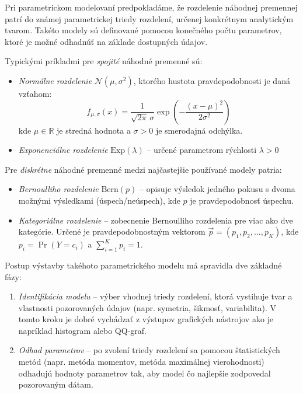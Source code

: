 Pri parametrickom modelovaní predpokladáme, že rozdelenie náhodnej premennej patrí do známej parametrickej triedy rozdelení, určenej konkrétnym analytickým tvarom. Takéto modely sú definované pomocou konečného počtu parametrov, ktoré je možné odhadnúť na základe dostupných údajov.

Typickými príkladmi pre \textit{spojité} náhodné premenné sú:
\begin{itemize}
  \item \textit{Normálne rozdelenie} $\mathcal{N}(\mu, \sigma^2)$, ktorého hustota pravdepodobnosti je daná vzťahom:
  \begin{equation}
    f_{\mu,\sigma}(x) = \frac{1}{\sqrt{2\pi}\,\sigma} \exp\left( -\frac{(x - \mu)^2}{2\sigma^2} \right)
  \end{equation}
  kde $\mu \in \mathbb{R}$ je stredná hodnota a $\sigma > 0$ je smerodajná odchýlka.
  
  \item \textit{Exponenciálne rozdelenie} $\mathrm{Exp}(\lambda)$ – určené parametrom rýchlosti $\lambda > 0$
\end{itemize}

Pre \textit{diskrétne} náhodné premenné medzi najčastejšie používané modely patria:
\begin{itemize}
  \item \textit{Bernoulliho rozdelenie} $\mathrm{Bern}(p)$ – opisuje výsledok jedného pokusu s dvoma možnými výsledkami (úspech/neúspech), kde $p$ je pravdepodobnosť úspechu.
  \item \textit{Kategoriálne rozdelenie} – zobecnenie Bernoulliho rozdelenia pre viac ako dve kategórie. Určené je pravdepodobnostným vektorom $\vec{p} = (p_1, p_2, \dots, p_K)$, kde $p_i = \Pr(Y = c_i)$ a $\sum_{i=1}^K p_i = 1$.
\end{itemize}

Postup výstavby takéhoto parametrického modelu má spravidla dve základné fázy:
\begin{enumerate}
  \item \textit{Identifikácia modelu} – výber vhodnej triedy rozdelení, ktorá vystihuje tvar a vlastnosti pozorovaných údajov (napr. symetria, šikmosť, variabilita). V tomto kroku je dobré vychádzať z výstupov grafických nástrojov ako je napríklad histogram alebo QQ-graf.
  
  \item \textit{Odhad parametrov} – po zvolení triedy rozdelení sa pomocou štatistických metód (napr. metóda momentov, metóda maximálnej vierohodnosti) odhadujú hodnoty parametrov tak, aby model čo najlepšie zodpovedal pozorovaným dátam.
\end{enumerate}

